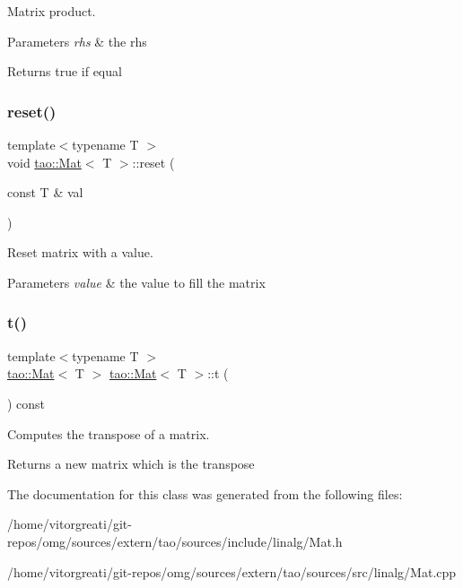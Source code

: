 Matrix product. 


\begin{DoxyParams}{Parameters}
{\em rhs} & the rhs \\
\hline
\end{DoxyParams}
\begin{DoxyReturn}{Returns}
true if equal 
\end{DoxyReturn}
\mbox{\label{classtao_1_1_mat_a503d508f8f80c64a494f323649f20c55}} 
\subsubsection{\texorpdfstring{reset()}{reset()}}
{\footnotesize\ttfamily template$<$typename T $>$ \\
void \mbox{\hyperlink{classtao_1_1_mat}{tao\+::\+Mat}}$<$ T $>$\+::reset (\begin{DoxyParamCaption}\item[{const T \&}]{val }\end{DoxyParamCaption})}



Reset matrix with a value. 


\begin{DoxyParams}{Parameters}
{\em value} & the value to fill the matrix \\
\hline
\end{DoxyParams}
\mbox{\label{classtao_1_1_mat_a2d900f9207772d4adcaaff6c697a9839}} 
\subsubsection{\texorpdfstring{t()}{t()}}
{\footnotesize\ttfamily template$<$typename T $>$ \\
\mbox{\hyperlink{classtao_1_1_mat}{tao\+::\+Mat}}$<$ T $>$ \mbox{\hyperlink{classtao_1_1_mat}{tao\+::\+Mat}}$<$ T $>$\+::t (\begin{DoxyParamCaption}{ }\end{DoxyParamCaption}) const}



Computes the transpose of a matrix. 

\begin{DoxyReturn}{Returns}
a new matrix which is the transpose 
\end{DoxyReturn}


The documentation for this class was generated from the following files\+:\begin{DoxyCompactItemize}
\item 
/home/vitorgreati/git-\/repos/omg/sources/extern/tao/sources/include/linalg/Mat.\+h\item 
/home/vitorgreati/git-\/repos/omg/sources/extern/tao/sources/src/linalg/Mat.\+cpp\end{DoxyCompactItemize}
